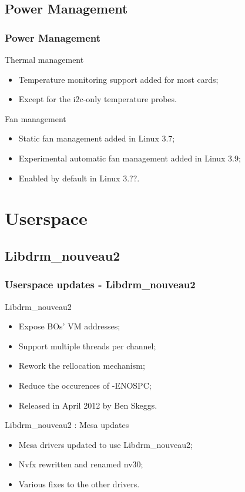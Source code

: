 \documentclass[11pt,english,compress]{beamer}
\begin{document}
\subsection{Power Management}

\begin{frame}
	\frametitle{Power Management}

	\begin{block}{Thermal management}
		\begin{itemize}
			\item Temperature monitoring support added for most cards;
			\item Except for the i2c-only temperature probes.
		\end{itemize}
	\end{block}

	\begin{block}{Fan management}
		\begin{itemize}
			\item Static fan management added in Linux 3.7;
			\item Experimental automatic fan management added in Linux 3.9;
			\item Enabled by default in Linux 3.??.
		\end{itemize}
	\end{block}
\end{frame}

\section{Userspace}

\subsection{Libdrm\_nouveau2}
\begin{frame}
	\frametitle{Userspace updates - Libdrm\_nouveau2}

	\begin{block}{Libdrm\_nouveau2}
		\begin{itemize}
			\item Expose BOs' VM addresses;
			\item Support multiple threads per channel;
			\item Rework the rellocation mechanism;
			\item Reduce the occurences of -ENOSPC;
			\item Released in April 2012 by Ben Skeggs.
		\end{itemize}
	\end{block}

	\begin{block}{Libdrm\_nouveau2 : Mesa updates}
		\begin{itemize}
			\item Mesa drivers updated to use Libdrm\_nouveau2;
			\item Nvfx rewritten and renamed nv30;
			\item Various fixes to the other drivers.
		\end{itemize}
	\end{block}
\end{frame}
\end{document}
